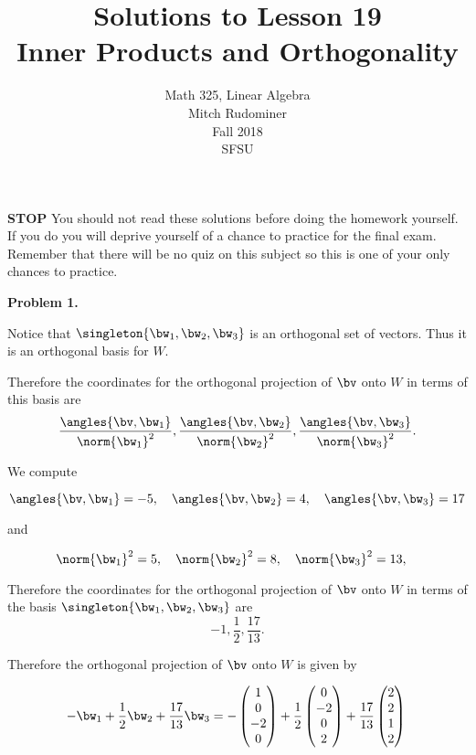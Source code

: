 \documentclass[oneside,12pt]{amsart}
\begin{document}
\title{Solutions to Lesson 19 \\ Inner Products and Orthogonality}
\author{Math 325, Linear Algebra \\ Mitch Rudominer \\ Fall 2018 \\ SFSU }
\date{}

\maketitle

\bigskip

\textbf{STOP} You should not read these solutions before doing the homework yourself.
If you do you will deprive yourself of a chance to practice for the final exam.
Remember that there will be no quiz on this subject so this is one of your only
chances to practice.

\bigskip

\textbf{Problem 1.}

\bigskip

Notice that $\singleton{\bw_1,\bw_2,\bw_3}$ is an orthogonal set of vectors.
Thus it is an orthogonal basis for $W$.

Therefore the coordinates for the orthogonal projection of $\bv$ onto $W$ in terms of this basis are
$$\frac{\angles{\bv,\bw_1}}{\norm{\bw_1}^2}, \frac{\angles{\bv,\bw_2}}{\norm{\bw_2}^2},\frac{\angles{\bv,\bw_3}}{\norm{\bw_3}^2}.$$

\bigskip

We compute

$$\angles{\bv,\bw_1}= -5, \quad \angles{\bv,\bw_2}= 4 , \quad \angles{\bv,\bw_3}= 17$$

\bigskip

and

$$\norm{\bw_1}^2=5, \quad \norm{\bw_2}^2=8, \quad \norm{\bw_3}^2=13, \quad $$

\bigskip

Therefore the coordinates for the orthogonal projection of $\bv$ onto $W$ in terms of the basis $\singleton{\bw_1,\bw_2,\bw_3}$ are
$$-1, \frac{1}{2},\frac{17}{13}.$$

\bigskip

Therefore the orthogonal projection of $\bv$ onto $W$  is given by

$$
-\bw_1  +\frac{1}{2} \bw_2 + \frac{17}{13}\bw_3 =
-
\begin{pmatrix}
1  \\
0  \\
-2 \\
0
\end{pmatrix}
+
\frac{1}{2}
\begin{pmatrix}
0 \\
-2\\
0 \\
2
\end{pmatrix}
+
\frac{17}{13}
\begin{pmatrix}
2 \\
2 \\
1 \\
2
\end{pmatrix}\\
$$
\end{document}
